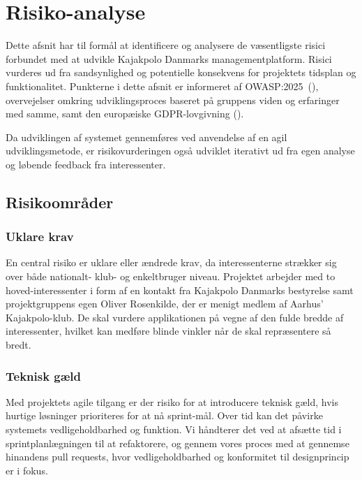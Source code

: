 \section{Risiko-analyse}\label{sec:risiko-analyse}

Dette afsnit har til formål at identificere og analysere de væsentligste risici forbundet med at
udvikle Kajakpolo Danmarks managementplatform.
Risici vurderes ud fra sandsynlighed og potentielle konsekvens for projektets tidsplan og funktionalitet.
Punkterne i dette afsnit er informeret af OWASP:2025~(\cite{owasptop10:2025}), overvejelser omkring udviklingsproces baseret på gruppens viden og erfaringer med samme, samt den europæiske GDPR-lovgivning (\cite{GDPR}).

Da udviklingen af systemet gennemføres ved anvendelse af en agil udviklingsmetode, er risikovurderingen også udviklet iterativt
ud fra egen analyse og løbende feedback fra interessenter.

\subsection{Risikoområder}\label{subsec:risikoomrader}
\subsubsection{Uklare krav}
En central risiko er uklare eller ændrede krav, da interessenterne strækker sig over både nationalt- klub- og enkeltbruger niveau.
Projektet arbejder med to hoved-interessenter i form af en kontakt fra Kajakpolo Danmarks bestyrelse samt projektgruppens egen Oliver Rosenkilde,
der er menigt medlem af Aarhus' Kajakpolo-klub.
De skal vurdere applikationen på vegne af den fulde bredde af interessenter, hvilket kan medføre blinde vinkler når de skal repræsentere så bredt.


\subsubsection{Teknisk gæld}
Med projektets agile tilgang er der risiko for at introducere teknisk gæld, hvis hurtige løsninger prioriteres for at nå sprint-mål.
Over tid kan det påvirke systemets vedligeholdbarhed og funktion.
Vi håndterer det ved at afsætte tid i sprintplanlægningen til at refaktorere, og gennem vores proces med at gennemse hinandens pull requests, hvor vedligeholdbarhed og konformitet til designprincip er i fokus.

